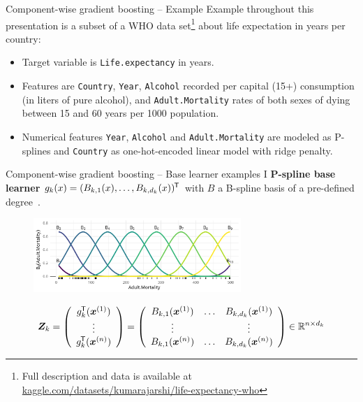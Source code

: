 \documentclass[10pt]{beamer}
\begin{document}
\begin{frame}{Component-wise gradient boosting – Example}
  Example throughout this presentation is a subset of a WHO data set\footnote[frame,1]{Full description and data is available at \url{kaggle.com/datasets/kumarajarshi/life-expectancy-who}} about life expectation in years per country:

  \begin{itemize}
    \item
      Target variable is \texttt{Life.expectancy} in years.
    \item
      Features are \texttt{Country}, \texttt{Year}, \texttt{Alcohol} recorded per capital (15+) consumption (in liters of pure alcohol), and \texttt{Adult.Mortality} rates of both sexes of dying between 15 and 60 years per 1000 population.

    \item
      Numerical features \texttt{Year}, \texttt{Alcohol} and \texttt{Adult.Mortality} are modeled as P-splines \citep{eilers1996flexible} and \texttt{Country} as one-hot-encoded linear model with ridge penalty.

  \end{itemize}
\end{frame}

\begin{frame}{Component-wise gradient boosting -- Base learner examples I}
  \textbf{P-spline base learner} $g_k(x) = (B_{k,1}(x), \dots, B_{k,d_k}(x))^\tran$ with $B$ a B-spline basis of a pre-defined degree~\citep{eilers1996flexible}.

  \begin{center}
    \begin{figure}
      \includegraphics[width=0.7\textwidth]{figures/bs-base/fig-bs0.png}
    \end{figure}

    $$
    \design_k = \left(\begin{array}{c}
      g_{k}^\tran(\xi[1]) \\
      \vdots \\
      g_{k}^\tran(\xi[n])
    \end{array}\right) = \left(\begin{array}{ccc}
      B_{k,1}(\xi[1]) & \dots & B_{k,d_k}(\xi[1]) \\
      \vdots &  & \vdots \\
      B_{k,1}(\xi[n]) & \dots & B_{k,d_k}(\xi[n])
    \end{array}\right)\in\R^{n\times d_k}
    $$
  \end{center}

\end{frame}
\end{document}
